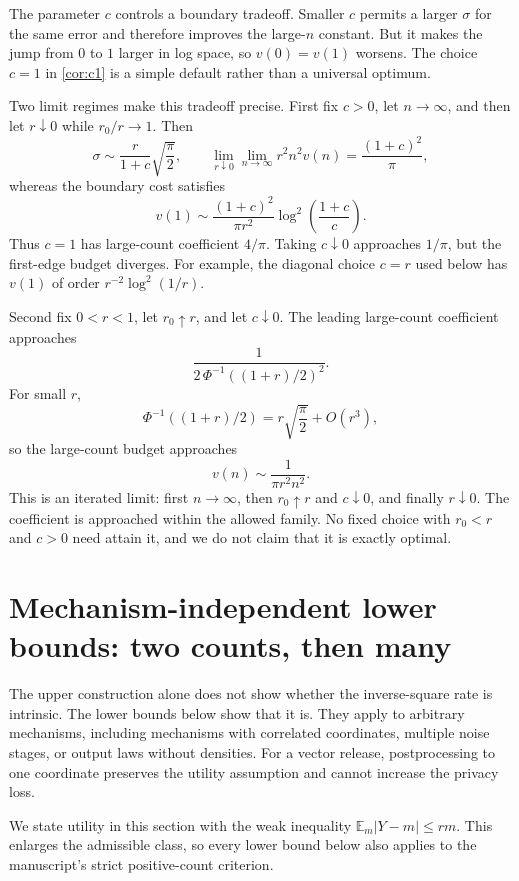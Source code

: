 \documentclass[11pt]{article}
\newcommand{\E}{\mathbb{E}}
\theoremstyle{definition}
\begin{document}
The parameter $c$ controls a boundary tradeoff. Smaller $c$ permits a larger $\sigma$ for the same error and therefore improves the large-$n$ constant. But it makes the jump from $0$ to $1$ larger in log space, so $v(0)=v(1)$ worsens. The choice $c=1$ in \cref{cor:c1} is a simple default rather than a universal optimum.

Two limit regimes make this tradeoff precise. First fix $c>0$, let $n\to\infty$, and then let $r\downarrow0$ while $r_0/r\to1$. Then
\[
  \sigma\sim \frac{r}{1+c}\sqrt{\frac{\pi}{2}},
  \qquad
  \lim_{r\downarrow0}\lim_{n\to\infty}r^2n^2v(n)
  =\frac{(1+c)^2}{\pi},
\]
whereas the boundary cost satisfies
\[
  v(1)\sim
  \frac{(1+c)^2}{\pi r^2}
  \log^2\!\left(\frac{1+c}{c}\right).
\]
Thus $c=1$ has large-count coefficient $4/\pi$. Taking $c\downarrow0$ approaches $1/\pi$, but the first-edge budget diverges. For example, the diagonal choice $c=r$ used below has $v(1)$ of order $r^{-2}\log^2(1/r)$.

Second fix $0<r<1$, let $r_0\uparrow r$, and let $c\downarrow0$. The leading large-count coefficient approaches
\[
  \frac{1}{2\,\Phi^{-1}((1+r)/2)^2}.
\]
For small $r$,
\[
  \Phi^{-1}((1+r)/2)
  =r\sqrt{\frac{\pi}{2}}+O(r^3),
\]
so the large-count budget approaches
\begin{equation}
  v(n)\sim \frac{1}{\pi r^2n^2}.
  \label{eq:smallrconstant}
\end{equation}
This is an iterated limit: first $n\to\infty$, then $r_0\uparrow r$ and $c\downarrow0$, and finally $r\downarrow0$. The coefficient is approached within the allowed family. No fixed choice with $r_0<r$ and $c>0$ need attain it, and we do not claim that it is exactly optimal.

\section{Mechanism-independent lower bounds: two counts, then many}
\label{sec:lower}

The upper construction alone does not show whether the inverse-square rate is intrinsic. The lower bounds below show that it is. They apply to arbitrary mechanisms, including mechanisms with correlated coordinates, multiple noise stages, or output laws without densities. For a vector release, postprocessing to one coordinate preserves the utility assumption and cannot increase the privacy loss.

We state utility in this section with the weak inequality $\E_m|Y-m|\le rm$. This enlarges the admissible class, so every lower bound below also applies to the manuscript's strict positive-count criterion.
\end{document}
